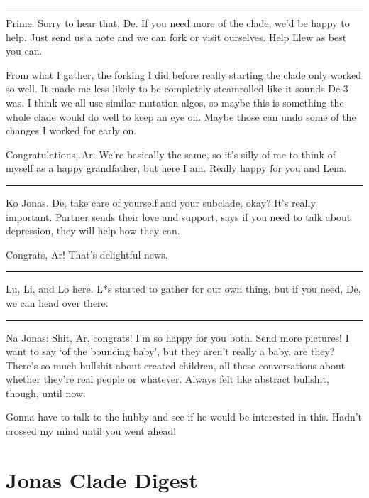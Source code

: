 \begin{center}\rule{0.5\linewidth}{\linethickness}\end{center}

Prime. Sorry to hear that, De. If you need more of the clade, we'd be happy to help. Just send us a note and we can fork or visit ourselves. Help Llew as best you can.

From what I gather, the forking I did before really starting the clade only worked so well. It made me less likely to be completely steamrolled like it sounds De-3 was. I think we all use similar mutation algos, so maybe this is something the whole clade would do well to keep an eye on. Maybe those can undo some of the changes I worked for early on.

Congratulations, Ar. We're basically the same, so it's silly of me to think of myself as a happy grandfather, but here I am. Really happy for you and Lena.

\begin{center}\rule{0.5\linewidth}{\linethickness}\end{center}

Ko Jonas. De, take care of yourself and your subclade, okay? It's really important. Partner sends their love and support, says if you need to talk about depression, they will help how they can.

Congrats, Ar! That's delightful news.

\begin{center}\rule{0.5\linewidth}{\linethickness}\end{center}

Lu, Li, and Lo here. L*s started to gather for our own thing, but if you need, De, we can head over there.

\begin{center}\rule{0.5\linewidth}{\linethickness}\end{center}

Na Jonas: Shit, Ar, congrats! I'm so happy for you both. Send more pictures! I want to say `of the bouncing baby', but they aren't really a baby, are they? There's so much bullshit about created children, all these conversations about whether they're real people or whatever. Always felt like abstract bullshit, though, until now.

Gonna have to talk to the hubby and see if he would be interested in this. Hadn't crossed my mind until you went ahead!

\newpage
\hypertarget{jonas-clade-digest-3}{%
\section*{Jonas Clade Digest}\label{jonas-clade-digest-3}}

